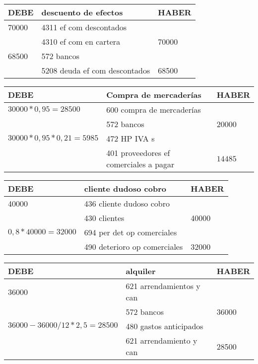 \documentclass[a4paper,12pt]{article}
\begin{document}
\begin{table}[H]
    \centering
    \begin{tabular}{|p{3cm}|p{6cm}|p{3cm}|}
    \hline
    \textbf{DEBE} & \textbf{descuento de efectos} & \textbf{HABER} \\
    \hline
    70000 & 4311 ef com descontados & \\
    \hline
    & 4310 ef com en cartera & 70000\\
    \hline
    68500 & 572 bancos & \\
    \hline
    & 5208 deuda ef com descontados & 68500 \\
    \hline
    \end{tabular}
\end{table}

\begin{table}[H]
    \centering
    \begin{tabular}{|p{3cm}|p{6cm}|p{3cm}|}
    \hline
    \textbf{DEBE} & \textbf{Compra de mercaderías} & \textbf{HABER} \\
    \hline
    $30000*0,95=28500$& 600 compra de mercaderías & \\
    \hline
     & 572 bancos & 20000 \\
    \hline
    $30000*0,95*0,21 = 5985$& 472 HP IVA s & \\
    \hline
    & 401 proveedores ef comerciales a pagar& $14485$\\
    \hline
    \end{tabular}
\end{table}

\begin{table}[H]
    \centering
    \begin{tabular}{|p{3cm}|p{6cm}|p{3cm}|}
    \hline
    \textbf{DEBE} & \textbf{cliente dudoso cobro} & \textbf{HABER} \\
    \hline
    40000 & 436 cliente dudoso cobro& \\
    \hline
    & 430 clientes & 40000\\
    \hline
    $0,8*40000=32000$& 694 per det op comerciales& \\
    \hline
    & 490 deterioro op comerciales& 32000 \\
    \hline

    \end{tabular}
\end{table}

\begin{table}[H]
    \centering
    \begin{tabular}{|p{3cm}|p{6cm}|p{3cm}|}
    \hline
    \textbf{DEBE} & \textbf{alquiler} & \textbf{HABER} \\
    \hline
    36000 & 621 arrendamientos y can& \\
    \hline
    & 572 bancos & 36000\\
    \hline
    $36000 - 36000/12 * 2,5 = 28500 $& 480 gastos anticipados& \\
    \hline
    & 621 arrendamiento y can & 28500\\
    \hline
    \end{tabular}
\end{table}
\end{document}
